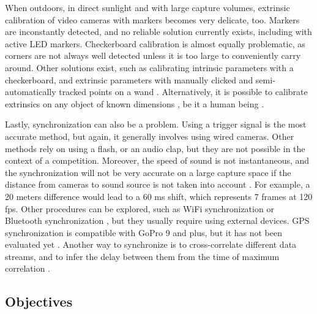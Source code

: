 When outdoors, in direct sunlight and with large capture volumes, extrinsic calibration of video cameras with markers becomes very delicate, too. Markers are inconstantly detected, and no reliable solution currently exists, including with active LED markers. Checkerboard calibration is almost equally problematic, as corners are not always well detected unless it is too large to conveniently carry around. Other solutions exist, such as calibrating intrinsic parameters with a checkerboard, and extrinsic parameters with manually clicked and semi-automatically tracked points on a wand \cite{Argus2017}. 
Alternatively, it is possible to calibrate extrinsics on any object of known dimensions \cite{Dawson-Howe1994}, be it a human being \cite{Liu2022a}.

Lastly, synchronization can also be a problem. Using a trigger signal is the most accurate method, but again, it generally involves using wired cameras. Other methods rely on using a flash, or an audio clap, but they are not possible in the context of a competition. Moreover, the speed of sound is not instantaneous, and the synchronization will not be very accurate on a large capture space if the distance from cameras to sound source is not taken into account \cite{Hasler2009}. For example, a 20 meters difference would lead to a 60 ms shift, which represents 7 frames at 120 fps. Other procedures can be explored, such as WiFi synchronization \cite{Romanov2019} or Bluetooth synchronization \cite{Asgarian2022}, but they usually require using external devices. GPS synchronization is compatible with GoPro 9 and plus, but it has not been evaluated yet \cite{GoPro2022}. Another way to synchronize is to cross-correlate different data streams, and to infer the delay between them from the time of maximum correlation \cite{Plotz2012}. 


\subsection{Objectives}

